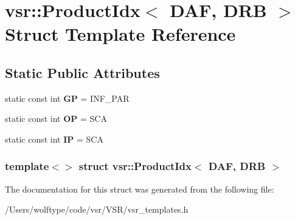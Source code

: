 \hypertarget{structvsr_1_1_product_idx_3_01_d_a_f_00_01_d_r_b_01_4}{\section{vsr\-:\-:Product\-Idx$<$ D\-A\-F, D\-R\-B $>$ Struct Template Reference}
\label{structvsr_1_1_product_idx_3_01_d_a_f_00_01_d_r_b_01_4}
}
\subsection*{Static Public Attributes}
\begin{DoxyCompactItemize}
\item 
\hypertarget{structvsr_1_1_product_idx_3_01_d_a_f_00_01_d_r_b_01_4_aba056d6811acdcbe28cbaeadcb7371cc}{static const int {\bfseries G\-P} = I\-N\-F\-\_\-\-P\-A\-R}\label{structvsr_1_1_product_idx_3_01_d_a_f_00_01_d_r_b_01_4_aba056d6811acdcbe28cbaeadcb7371cc}

\item 
\hypertarget{structvsr_1_1_product_idx_3_01_d_a_f_00_01_d_r_b_01_4_ae72c7cc9cf5fc5916223b24f3d39c56a}{static const int {\bfseries O\-P} = S\-C\-A}\label{structvsr_1_1_product_idx_3_01_d_a_f_00_01_d_r_b_01_4_ae72c7cc9cf5fc5916223b24f3d39c56a}

\item 
\hypertarget{structvsr_1_1_product_idx_3_01_d_a_f_00_01_d_r_b_01_4_a95c137c5398a04f2e1f6c6cd1fa9ffe4}{static const int {\bfseries I\-P} = S\-C\-A}\label{structvsr_1_1_product_idx_3_01_d_a_f_00_01_d_r_b_01_4_a95c137c5398a04f2e1f6c6cd1fa9ffe4}

\end{DoxyCompactItemize}
\subsubsection*{template$<$$>$ struct vsr\-::\-Product\-Idx$<$ D\-A\-F, D\-R\-B $>$}



The documentation for this struct was generated from the following file\-:\begin{DoxyCompactItemize}
\item 
/\-Users/wolftype/code/vsr/\-V\-S\-R/vsr\-\_\-templates.\-h\end{DoxyCompactItemize}

